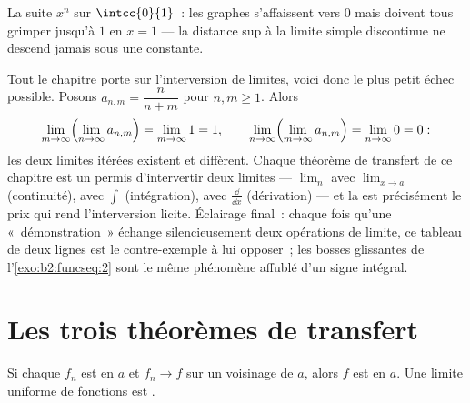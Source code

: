 \begin{omfigure}

{\small La suite $x^n$ sur $\intcc{0}{1}$~: les graphes s'affaissent
vers $0$ mais doivent tous grimper jusqu'à $1$ en $x = 1$ --- la
distance sup à la limite simple discontinue ne descend jamais sous une
constante.}
\end{omfigure}

\begin{example}\label{ex:b2:funcseq:doublelimit}
Tout le chapitre porte sur l'interversion de limites, voici donc le
plus petit échec possible. Posons $a_{n,m} = \dfrac{n}{n+m}$ pour
$n, m \geq 1$. Alors
\[
\lim_{m\to\infty}\Bigl(\lim_{n\to\infty}a_{n,m}\Bigr)
= \lim_{m\to\infty} 1 = 1,
\qquad
\lim_{n\to\infty}\Bigl(\lim_{m\to\infty}a_{n,m}\Bigr)
= \lim_{n\to\infty} 0 = 0 :
\]
les deux limites itérées existent et diffèrent. Chaque théorème de
transfert de ce chapitre est un permis d'intervertir deux limites ---
$\lim_n$ avec $\lim_{x\to a}$ (continuité), avec $\int$
(intégration), avec $\frac{\dd}{\dd x}$ (dérivation) --- et la
 est précisément le prix qui rend l'interversion
licite. Éclairage final~: chaque fois qu'une «~démonstration~»
échange silencieusement deux opérations de limite, ce tableau de deux
lignes est le contre-exemple à lui opposer~; les bosses glissantes de
l'\cref{exo:b2:funcseq:2} sont le même phénomène affublé d'un signe
intégral.
\end{example}

\section{Les trois théorèmes de transfert}

\begin{theorem}[Continuité]\label{thm:b2:funcseq:continuity}
Si chaque $f_n$ est  en $a$ et $f_n \to f$  sur un
voisinage de $a$, alors $f$ est  en $a$. Une limite uniforme
de fonctions  est .
\end{theorem}

